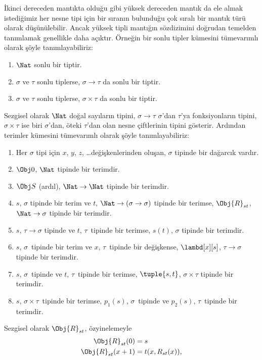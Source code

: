 \documentclass[../../../include/open-logic-section]{subfiles}
\begin{document}
İkinci dereceden mantıkta olduğu gibi yüksek dereceden mantık da ele almak
istediğimiz her nesne tipi için bir sıranın bulunduğu çok sıralı bir mantık
türü olarak düşünülebilir. Ancak yüksek tipli mantığın sözdizimini doğrudan
temelden tanımlamak genellikle daha açıktır. Örneğin bir sonlu tipler kümesini
tümevarımlı olarak şöyle tanımlayabiliriz:
\begin{enumerate}
\item $\Nat$ sonlu bir tiptir.
\item $\sigma$ ve $\tau$ sonlu tiplerse, $\sigma \to \tau$ da sonlu bir
  tiptir.
\item $\sigma$ ve $\tau$ sonlu tiplerse, $\sigma \times \tau$ da sonlu bir
  tiptir.
\end{enumerate}
Sezgisel olarak $\Nat$ doğal sayıların tipini, $\sigma \to \tau$ $\sigma$'dan
$\tau$'ya fonksiyonların tipini, $\sigma \times \tau$ ise biri $\sigma$'dan,
öteki $\tau$'dan olan nesne çiftlerinin tipini gösterir. Ardından terimler
kümesini tümevarımlı olarak şöyle tanımlayabiliriz:
\begin{enumerate}
\item Her $\sigma$ tipi için $x$, $y$, $z$, \dots değişkenlerinden oluşan,
  $\sigma$ tipinde bir dağarcık vardır.
\item $\Obj 0$, $\Nat$ tipinde bir terimdir.
\item $\Obj S$ (ardıl), $\Nat \to \Nat$ tipinde bir terimdir.
\item $s$, $\sigma$ tipinde bir terim ve $t$, $\Nat \to (\sigma \to
  \sigma)$ tipinde bir terimse, $\Obj{R}_{st}$, $\Nat \to \sigma$ tipinde
  bir terimdir.
\item $s$, $\tau \to \sigma$ tipinde ve $t$, $\tau$~tipinde bir terimse,
  $s(t)$, $\sigma$ tipinde bir terimdir.
\item $s$, $\sigma$~tipinde bir terim ve $x$, $\tau$~tipinde bir değişkense,
  $\lambd[x][s]$, $\tau \to \sigma$ tipinde bir terimdir.
\item $s$, $\sigma$~tipinde ve $t$, $\tau$~tipinde bir terimse,
  $\tuple{s, t}$, $\sigma \times \tau$ tipinde bir terimdir.
\item $s$, $\sigma \times \tau$~tipinde bir terimse, $p_1(s)$,
  $\sigma$~tipinde ve $p_2(s)$, $\tau$~tipinde bir terimdir.
\end{enumerate}
Sezgisel olarak $\Obj{R}_{st}$, özyinelemeyle
\begin{align*}
\Obj{R}_{st}(0) & = s \\
\Obj{R}_{st}(x+1) & = t(x, R_{st}(x)),
\end{align*}
\end{document}
